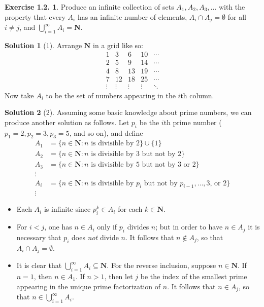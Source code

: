 \documentclass[12pt]{article}
\theoremstyle{definition}
\theoremstyle{exercise}
\newtheorem{exercise}{Exercise 1.2.}
\theoremstyle{solution}
\newtheorem*{solution}{Solution}
\begin{document}
\begin{exercise}
\label{ex:4}
    Produce an infinite collection of sets \( A_1, A_2, A_3, \ldots \) with the property that every \( A_i \) has an infinite number of elements, \( A_i \cap A_j = \emptyset \) for all \( i \neq j \), and \( \bigcup_{i=1}^{\infty} A_i = \mathbf{N} \).
\end{exercise}

\begin{solution}[1]
    Arrange \( \mathbf{N} \) in a grid like so:
    \[
        \begin{matrix}
            1 & 3 & 6 & 10 & \cdots \\
            2 & 5 & 9 & 14 & \cdots \\
            4 & 8 & 13 & 19 & \cdots \\
            7 & 12 & 18 & 25 & \cdots \\
            \vdots & \vdots & \vdots & \vdots & \ddots
        \end{matrix}
    \]
    Now take \( A_i \) to be the set of numbers appearing in the \( i \)th column.
\end{solution}

\begin{solution}[2]
    Assuming some basic knowledge about prime numbers, we can produce another solution as follows. Let \( p_i \) be the \(i\)th prime number (\( p_1 = 2, p_2 = 3, p_3 = 5 \), and so on), and define
    \begin{align*}
        A_1 &= \{ n \in \mathbf{N} : n \text{ is divisible by 2} \} \cup \{ 1 \} \\
        A_2 &= \{ n \in \mathbf{N} : n \text{ is divisible by 3 but not by 2} \} \\
        A_3 &= \{ n \in \mathbf{N} : n \text{ is divisible by 5 but not by 3 or 2} \} \\
        \vdots & \\
        A_i &= \{ n \in \mathbf{N} : n \text{ is divisible by } p_i \text { but not by } p_{i-1}, \ldots, \text{3, or 2} \} \\
        \vdots &
    \end{align*}
    \begin{itemize}
        \item Each \( A_i \) is infinite since \( p_i^k \in A_i \) for each \( k \in \mathbf{N} \).
        \item For \( i < j \), one has \( n \in A_i \) only if \( p_i \) divides \( n \); but in order to have \( n \in A_j \) it is necessary that \( p_i \) does \textit{not} divide \( n \). It follows that \( n \not\in A_j \), so that \( A_i \cap A_j = \emptyset \).
        \item It is clear that \( \bigcup_{i=1}^{\infty} A_i \subseteq \mathbf{N} \). For the reverse inclusion, suppose \( n \in \mathbf{N} \). If \( n = 1 \), then \( n \in A_1 \). If \( n > 1 \), then let \( j \) be the index of the smallest prime appearing in the unique prime factorization of \( n \). It follows that \( n \in A_j \), so that \( n \in \bigcup_{i=1}^{\infty} A_i \).
    \end{itemize}
\end{solution}
\end{document}
